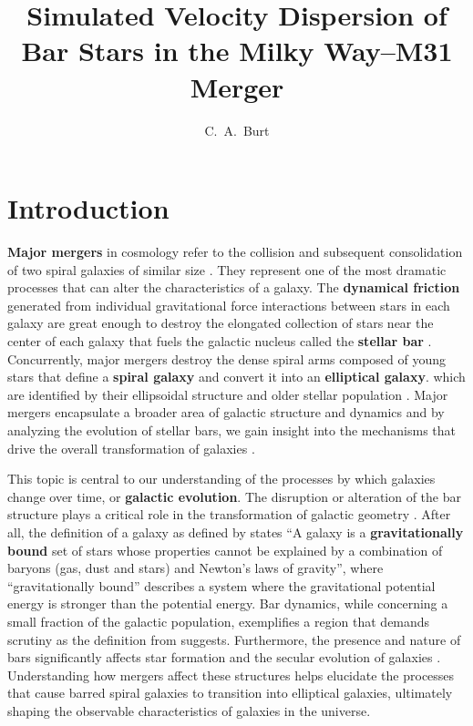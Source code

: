 \documentclass[twocolumn]{aastex631}
\begin{document}
\title{Simulated Velocity Dispersion of Bar Stars in the Milky Way–M31 Merger}

\author[0009-0008-2061-4946]{C.~A.~Burt}



\section{Introduction}

\textbf{Major mergers} in cosmology refer to the collision and
subsequent consolidation of two spiral galaxies of similar size
\citep[e.g.,][]{mutch:11}. They represent one of the most dramatic
processes that can alter the characteristics of a galaxy. The
\textbf{dynamical friction} generated from individual gravitational
force interactions between stars in each galaxy are great enough to
destroy the elongated collection of stars near the center of each
galaxy that fuels the galactic nucleus called the \textbf{stellar bar}
\citep[e.g.,][]{knapen:02}. Concurrently, major mergers destroy the
dense spiral arms composed of young stars that define a \textbf{spiral
  galaxy} and convert it into an \textbf{elliptical galaxy}. which are
identified by their ellipsoidal structure and older stellar population
\citep{hubble:36}. Major mergers encapsulate a broader area of
galactic structure and dynamics and by analyzing the evolution of
stellar bars, we gain insight into the mechanisms that drive the
overall transformation of galaxies \citep[e.g.,][]{vandermarel:01}.

This topic is central to our understanding of the processes by which
galaxies change over time, or \textbf{galactic evolution}. The
disruption or alteration of the bar structure plays a critical role in
the transformation of galactic geometry \citep{wu:18}. After all, the
definition of a galaxy as defined by \citet{willman:12} states ``A
galaxy is a \textbf{gravitationally bound} set of stars whose
properties cannot be explained by a combination of baryons (gas, dust
and stars) and Newton’s laws of gravity'', where ``gravitationally
bound'' describes a system where the gravitational potential energy is
stronger than the potential energy. Bar dynamics, while concerning a
small fraction of the galactic population, exemplifies a region that
demands scrutiny as the definition from \citet{willman:12}
suggests. Furthermore, the presence and nature of bars significantly
affects star formation and the secular evolution of galaxies
\citep{schoenrich:17}. Understanding how mergers affect these
structures helps elucidate the processes that cause barred spiral
galaxies to transition into elliptical galaxies, ultimately shaping
the observable characteristics of galaxies in the universe.
\end{document}
